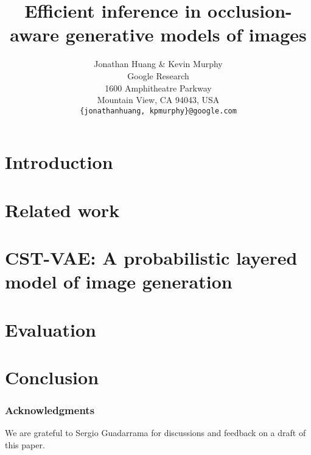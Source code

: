 \documentclass{article} %
\title{Efficient inference in occlusion-aware generative models of images}
\author{Jonathan Huang \& Kevin Murphy \\
Google Research \\
1600 Amphitheatre Parkway \\
Mountain View, CA 94043, USA\\
\texttt{\{jonathanhuang, kpmurphy\}@google.com}
}
\begin{document}
\maketitle



\section{Introduction}


\section{Related work}


\section{CST-VAE: A probabilistic layered model of image generation}


\section{Evaluation}


\section{Conclusion}


%

\subsubsection*{Acknowledgments}
We are grateful to Sergio Guadarrama for discussions and feedback on 
a draft of this paper.



\end{document}
